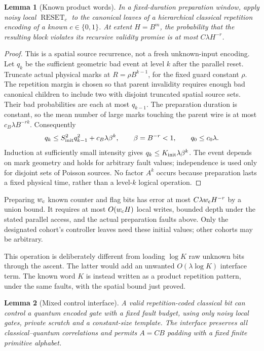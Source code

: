 \documentclass[11pt]{article}
\newtheorem{lemma}{Lemma}
\begin{document}
\begin{lemma}[Known product words]\label{lem:init}
In a fixed-duration preparation window, apply noisy local
$\operatorname{RESET}_c$ to the canonical leaves of a hierarchical
classical repetition encoding of a known $c\in\{0,1\}$. At extent $H=B^m$,
the probability that the resulting block violates its recursive validity
promise is at most $C\lambda H^{-r}$.
\end{lemma}

\begin{proof}
This is a spatial source recurrence, not a fresh unknown-input encoding.
Let $q_k$ be the sufficient geometric bad event at level $k$ after the
parallel reset. Truncate actual physical marks at
$R=\rho B^{k-1}$, for the fixed guard constant $\rho$. The repetition
margin is chosen so that parent invalidity requires enough bad canonical
children to include two with disjoint truncated spatial source sets.
Their bad probabilities are each at most $q_{k-1}$. The preparation
duration is constant, so the mean number of large marks touching the
parent wire is at most $c_B\lambda B^{-rk}$. Consequently
\[
 q_k\leq S_{\rm init}^2q_{k-1}^2+c_B\lambda\beta^k,
 \qquad \beta=B^{-r}<1,\qquad q_0\leq c_0\lambda.
\]
Induction at sufficiently small intensity gives
$q_k\leq K_{\rm init}\lambda\beta^k$.
The event depends on mark geometry and holds for arbitrary fault values;
independence is used only for disjoint sets of Poisson sources.
No factor $A^k$ occurs because preparation lasts a fixed physical time,
rather than a level-$k$ logical operation.
\end{proof}

Preparing $w_{\rm c}$ known counter and flag bits has error at most
$C\lambda w_{\rm c}H^{-r}$ by a union bound. It requires at most
$O(w_{\rm c}H)$ local writes, bounded depth under the stated parallel
access, and the actual preparation faults above. Only the designated
cohort's controller leaves need these initial values; other cohorts may
be arbitrary.

This operation is deliberately different from loading $\log K$ raw
unknown bits through the ascent. The latter would add an unwanted
$O(\lambda\log K)$ interface term. The known word $K$ is instead written
as a product repetition pattern, under the same faults, with the spatial
bound just proved.

\begin{lemma}[Mixed control interface]\label{lem:hybrid}
A valid repetition-coded classical bit can control a quantum encoded
gate with a fixed fault budget, using only noisy local gates, private
scratch and a constant-size template. The interface preserves all
classical--quantum correlations and permits $A=CB$ padding with a fixed
finite primitive alphabet.
\end{lemma}
\end{document}
